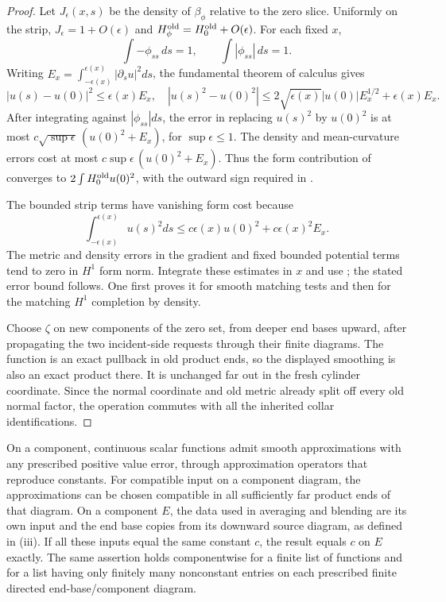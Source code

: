 \begin{proof}
Let $J_\epsilon(x,s)$ be the density of $\beta_\phi$ relative to
the zero slice.  Uniformly on the strip,
$J_\epsilon=1+O(\epsilon)$ and
$H^{\rm old}_\phi=H^{\rm old}_0+O(\epsilon)$.
For each fixed $x$,
\[
 \int-\phi_{ss}\,ds=1,\qquad
 \int|\phi_{ss}|\,ds=1.
\]
Writing $E_x=\int_{-\epsilon(x)}^{\epsilon(x)}|\partial_su|^2ds$,
the fundamental theorem of calculus gives
\[
 |u(s)-u(0)|^2\le\epsilon(x)E_x,
 \quad
 |u(s)^2-u(0)^2|
 \le2\sqrt{\epsilon(x)}|u(0)|E_x^{1/2}+\epsilon(x)E_x.
\]
After integrating against $|\phi_{ss}|ds$, the error in replacing
$u(s)^2$ by $u(0)^2$ is at most
$c\sqrt{\sup\epsilon}\,(u(0)^2+E_x)$, for $\sup\epsilon\le1$.
The density and mean-curvature errors cost at most
$c\sup\epsilon\,(u(0)^2+E_x)$.  Thus the form contribution of
 converges to
$2\int H^{\rm old}_0u(0)^2$, with the outward sign required in
.

The bounded strip terms have vanishing form cost because
\[
 \int_{-\epsilon(x)}^{\epsilon(x)}u(s)^2ds
 \le c\epsilon(x)u(0)^2+c\epsilon(x)^2E_x.
\]
The metric and density errors in the gradient and fixed bounded
potential terms tend to zero in $H^1$ form norm.  Integrate these
estimates in $x$ and use ; the stated error bound
follows.  One first proves it for smooth matching tests and then for
the matching $H^1$ completion by density.

Choose $\zeta$ on new components of the zero set, from deeper end bases upward, after
propagating the two incident-side requests through their finite
diagrams.  The function is an exact pullback in old product ends, so
the displayed smoothing is also an exact product there.  It is
unchanged far out in the fresh cylinder coordinate.  Since the normal
coordinate and old metric already split off every old normal factor,
the operation commutes with all the inherited collar identifications.
\end{proof}


\begin{lemma}\label{regular:constant-preservation}
On a component, continuous scalar functions admit smooth approximations
with any prescribed positive value error, through approximation
operators that reproduce constants.  For compatible input on a component diagram, the
approximations can be chosen compatible in all sufficiently far product
ends of that diagram. On a component $E$, the data used in averaging and
blending are its own input and the end base copies from its downward source
diagram, as defined in (iii). If all these inputs equal
the same constant $c$, the result equals $c$ on $E$ exactly.  The same assertion holds componentwise for a finite list
of functions and for a list having only finitely many nonconstant entries
on each prescribed finite directed end-base/component diagram.
\end{lemma}

